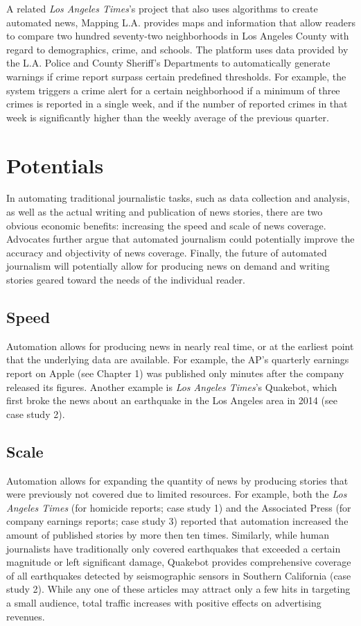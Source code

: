 \documentclass[notoc, symmetric, nobib, nols]{towcenter-guideto-book}
\begin{document}
A related \textit{Los Angeles Times}'s project that also uses algorithms to create automated news, Mapping L.A. provides maps and information that allow readers to compare two hundred seventy-two neighborhoods in Los Angeles County with regard to demographics, crime, and schools. The platform uses data provided by the L.A. Police and County Sheriff's Departments to automatically generate warnings if crime report surpass certain predefined thresholds. For example, the system triggers a crime alert for a certain neighborhood if a minimum of three crimes is reported in a single week, and if the number of reported crimes in that week is significantly higher than the weekly average of the previous quarter.

\section{Potentials} 

In automating traditional journalistic tasks, such as data collection and analysis, as well as the actual writing and publication of news stories, there are two obvious economic benefits: increasing the speed and scale of news coverage. Advocates further argue that automated journalism could potentially improve the accuracy and objectivity of news coverage. Finally, the future of automated journalism will potentially allow for producing news on demand and writing stories geared toward the needs of the individual reader.
 
\subsection{Speed}

Automation allows for producing news in nearly real time, or at the earliest point that the underlying data are available. For example, the AP's quarterly earnings report on Apple (see Chapter 1) was published only minutes after the company released its figures. Another example is \textit{Los Angeles Times}'s Quakebot, which first broke the news about an earthquake in the Los Angeles area in 2014 (see case study 2). 

\subsection{Scale}

Automation allows for expanding the quantity of news by producing stories that were previously not covered due to limited resources. For example, both the \textit{Los Angeles Times} (for homicide reports; case study 1) and the Associated Press (for company earnings reports; case study 3) reported that automation increased the amount of published stories by more then ten times. Similarly, while human journalists have traditionally only covered earthquakes that exceeded a certain magnitude or left significant damage, Quakebot provides comprehensive coverage of all earthquakes detected by seismographic sensors in Southern California (case study 2). While any one of these articles may attract only a few hits in targeting a small audience, total traffic increases with positive effects on advertising revenues.
\end{document}
